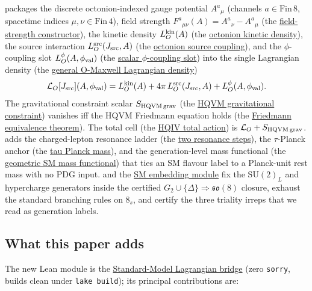 \documentclass[11pt]{amsart}
\begin{document}
\cite{hqiv-oct-action-paper} packages the discrete octonion-indexed gauge
potential $A^a{}_\mu$ (channels $a\in\mathrm{Fin}\,8$, spacetime indices
$\mu,\nu\in\mathrm{Fin}\,4$), field strength
$F^a{}_{\mu\nu}(A)=A^a{}_\nu - A^a{}_\mu$ (the
\hyperref[lean:F-from-A]{field-strength constructor}), the kinetic density
$L_O^{\rm kin}(A)$ (the
\hyperref[lean:LO-kin]{octonion kinetic density}), the source interaction
$L_O^{\rm src}(J_{\rm src},A)$ (the
\hyperref[lean:LO-src]{octonion source coupling}), and the $\phi$-coupling
slot $L_O^\phi(A,\phi_{\rm val})$ (the
\hyperref[lean:LO-phi]{scalar $\phi$-coupling slot}) into the single
Lagrangian density (the
\hyperref[lean:LO-maxwell]{general O-Maxwell Lagrangian density})
\[
\mathcal{L}_O[J_{\rm src}](A,\phi_{\rm val})
= L_O^{\rm kin}(A) + 4\pi\,L_O^{\rm src}(J_{\rm src},A)
+ L_O^\phi(A,\phi_{\rm val}).
\]
The gravitational constraint scalar $S_{\rm HQVM\,grav}$ (the
\hyperref[lean:SHQVM-grav]{HQVM gravitational constraint}) vanishes iff the
HQVM Friedmann equation holds (the
\hyperref[lean:friedmann-iff]{Friedmann equivalence theorem}). The total cell
(the \hyperref[lean:action-total]{HQIV total action}) is
$\mathcal{L}_O+S_{\rm HQVM\,grav}$. \cite{hqiv-tuft-dynamic-mass-spectrum-paper} adds the
charged-lepton resonance ladder (the
\hyperref[lean:resonance-steps]{two resonance steps}), the $\tau$-Planck
anchor (the \hyperref[lean:m-tau-pl]{tau Planck mass}), and the
generation-level mass functional (the
\hyperref[lean:sm-mass-label]{geometric SM mass functional}) that ties an SM
flavour label to a Planck-unit rest mass with no PDG input.
\cite{hqiv-so8-paper} and the
\hyperref[lean:sm-embedding]{SM embedding module} fix the
$\mathrm{SU}(2)_L$ and hypercharge generators inside the certified
$G_2\cup\{\Delta\}\Rightarrow\mathfrak{so}(8)$ closure, exhaust the
standard branching rules on $8_s$, and certify the three triality irreps
that we read as generation labels.

\subsection{What this paper adds}
\label{subsec:adds}

The new Lean module is the
\hyperref[lean:sm-lagrangian-module]{Standard-Model Lagrangian bridge}
(zero \texttt{sorry}, builds clean under \texttt{lake build}); its principal
contributions are:
\end{document}
